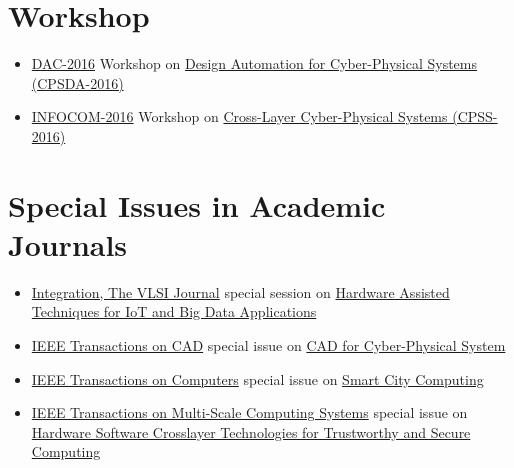 
\setcounter{section}{0}

\section{Workshop}
\begin{itemize}
    \item \href{https://dac.com/}{DAC-2016} Workshop on \href{http://www.ieee-cps.org/CPSDA-2016/}{Design Automation for Cyber-Physical Systems (CPSDA-2016)}
    \item \href{http://infocom2016.ieee-infocom.org/}{INFOCOM-2016} Workshop on \href{http://www.ieee-cps.org/CPSS-2016/}{Cross-Layer Cyber-Physical Systems (CPSS-2016)}
\end{itemize}

\section{Special Issues in Academic Journals}
\begin{itemize}
    \item
    \href{http://www.journals.elsevier.com/integration-the-vlsi-journal/}{Integration, The VLSI Journal} special session on
    \href{http://www.journals.elsevier.com/integration-the-vlsi-journal/call-for-papers/special-issue-on-hardware-assisted-techniques-for-iot/}{Hardware Assisted Techniques for IoT and Big Data Applications}
    \item 
    \href{http://ieee-ceda.org/publications/tcad}{IEEE Transactions on CAD} special issue on
    \href{http://ieee-ceda.org/images/tcad2/cfp_cyperphysical_tcad.pdf}{CAD for Cyber-Physical System}
    \item
    \href{http://www.computer.org/web/tc}{IEEE Transactions on Computers} special issue on
    \href{http://www.computer.org/cms/Computer.org/transactions/cfps/cfp_tcsi_stscc.pdf}{Smart City Computing}
    \item
    \href{http://www.computer.org/web/tmscs}{IEEE Transactions on Multi-Scale Computing Systems} special issue on
    \href{http://www.computer.org/cms/Computer.org/transactions/cfps/cfp_tmscssi_hsclttsc.pdf}{Hardware Software Crosslayer Technologies for Trustworthy and Secure Computing}
\end{itemize}

